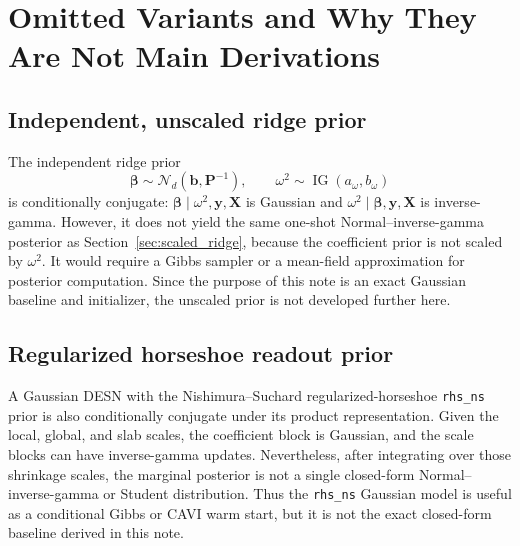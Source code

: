 \documentclass[11pt]{article}
\newcommand{\vect}[1]{\bm{#1}}
\newcommand{\mat}[1]{\bm{#1}}
\newcommand{\Normal}{\mathcal{N}}
\newcommand{\IG}{\operatorname{IG}}
\begin{document}
\section{Omitted Variants and Why They Are Not Main Derivations}
\label{sec:omitted_variants}

\subsection{Independent, unscaled ridge prior}
\label{subsec:unscaled_omitted}

The independent ridge prior
\begin{equation}
\label{eq:unscaled_prior_omitted}
\vect\beta\sim\Normal_d(\vect b,\mat P^{-1}),
\qquad
\omega^2\sim\IG(a_\omega,b_\omega)
\end{equation}
is conditionally conjugate: \(\vect\beta\mid\omega^2,\vect y,\mat X\) is
Gaussian and \(\omega^2\mid\vect\beta,\vect y,\mat X\) is inverse-gamma.
However, it does not yield the same one-shot Normal--inverse-gamma posterior as
Section~\ref{sec:scaled_ridge}, because the coefficient prior is not scaled by
\(\omega^2\). It would require a Gibbs sampler or a mean-field approximation
for posterior computation. Since the purpose of this note is an exact Gaussian
baseline and initializer, the unscaled prior is not developed further here.

\subsection{Regularized horseshoe readout prior}
\label{subsec:rhs_omitted}

A Gaussian DESN with the Nishimura--Suchard regularized-horseshoe
\texttt{rhs\_ns} prior is also conditionally conjugate under its product
representation. Given the local, global, and slab scales, the coefficient block
is Gaussian, and the scale blocks can have inverse-gamma updates. Nevertheless,
after integrating over those shrinkage scales, the marginal posterior is not a
single closed-form Normal--inverse-gamma or Student distribution. Thus the
\texttt{rhs\_ns} Gaussian model is useful as a conditional Gibbs or CAVI warm
start, but it is not the exact closed-form baseline derived in this note.
\end{document}
